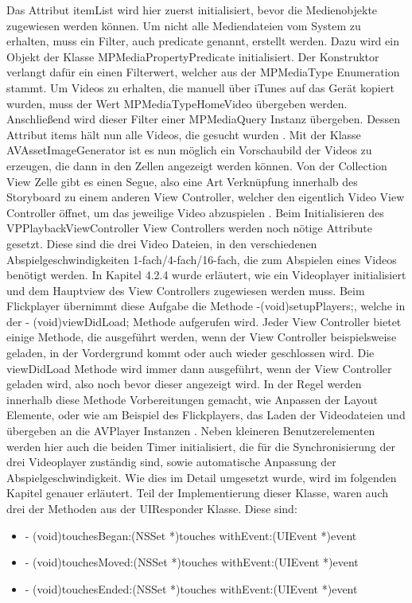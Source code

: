 \documentclass[11pt,a4paper]{report}
\begin{document}
Das Attribut itemList wird hier zuerst initialisiert, bevor die Medienobjekte zugewiesen werden können. Um nicht alle Mediendateien vom System zu erhalten, muss ein Filter, auch predicate genannt, erstellt werden. Dazu wird ein Objekt der Klasse MPMediaPropertyPredicate initialisiert. Der Konstruktor verlangt dafür ein einen Filterwert, welcher aus der MPMediaType Enumeration stammt. Um Videos zu erhalten, die manuell über iTunes auf das Gerät kopiert wurden, muss der Wert MPMediaTypeHomeVideo übergeben werden. Anschließend wird dieser Filter einer MPMediaQuery Instanz übergeben. Dessen Attribut items hält nun alle Videos, die gesucht wurden \cite{MPMediaQueryClassReference}. Mit der Klasse AVAssetImageGenerator ist es nun möglich ein Vorschaubild der Videos zu erzeugen, die dann in den Zellen angezeigt werden können. Von der Collection View Zelle gibt es einen Segue, also eine Art Verknüpfung innerhalb des Storyboard zu einem anderen View Controller, welcher den eigentlich Video View Controller öffnet, um das jeweilige Video abzuspielen \cite{StoryboardSegue}. Beim Initialisieren des VPPlaybackViewController View Controllers werden noch nötige Attribute gesetzt. Diese sind die drei Video Dateien, in den verschiedenen Abspielgeschwindigkeiten 1-fach/4-fach/16-fach, die zum Abspielen eines Videos benötigt werden. In Kapitel 4.2.4 wurde erläutert, wie ein Videoplayer initialisiert und dem Hauptview des View Controllers zugewiesen werden muss. Beim Flickplayer übernimmt diese Aufgabe die Methode -(void)setupPlayers;, welche in der - (void)viewDidLoad; Methode aufgerufen wird. Jeder View Controller bietet einige Methode, die ausgeführt werden, wenn der View Controller beispielsweise geladen, in der Vordergrund kommt oder auch wieder geschlossen wird. Die viewDidLoad Methode wird immer dann ausgeführt, wenn der View Controller geladen wird, also noch bevor dieser angezeigt wird. In der Regel werden innerhalb diese Methode Vorbereitungen gemacht, wie Anpassen der Layout Elemente, oder wie am Beispiel des Flickplayers, das Laden der Videodateien und übergeben an die AVPlayer Instanzen \cite{UIViewControllerClass}. Neben kleineren Benutzerelementen werden hier auch die beiden Timer initialisiert, die für die Synchronisierung der drei Videoplayer zuständig sind, sowie automatische Anpassung der Abspielgeschwindigkeit. Wie dies im Detail umgesetzt wurde, wird im folgenden Kapitel genauer erläutert. Teil der Implementierung dieser Klasse, waren auch drei der Methoden aus der UIResponder Klasse. Diese sind:
\begin{itemize}
\item - (void)touchesBegan:(NSSet *)touches withEvent:(UIEvent *)event
\item - (void)touchesMoved:(NSSet *)touches withEvent:(UIEvent *)event
\item - (void)touchesEnded:(NSSet *)touches withEvent:(UIEvent *)event
\end{itemize}
\end{document}
